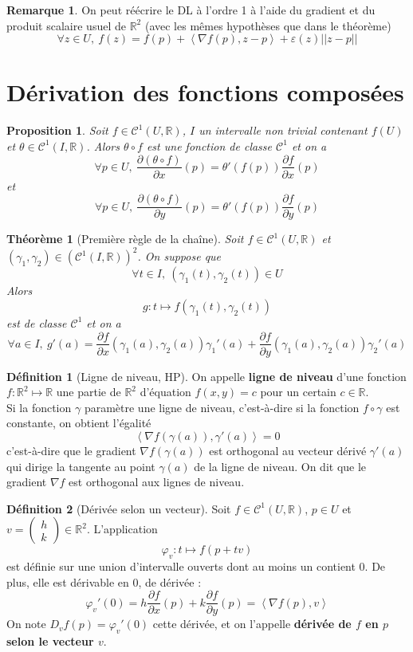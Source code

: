 \documentclass[french]{book}
\newcommand{\R}{\mathbb{R}}
\theoremstyle{plain}
\newtheorem{thm}{Théorème}[chapter]
\newtheorem{prop}{Proposition}[chapter]
\theoremstyle{definition}
\newtheorem{dfn}{Définition}[chapter]
\newtheorem{rmq}{Remarque}[chapter]
\theoremstyle{remark}
\begin{document}
\begin{rmq} On peut réécrire le DL à l'ordre 1 à l'aide du gradient et du produit scalaire usuel de $\R^2$ (avec les mêmes hypothèses que dans le théorème) $$\forall z \in U, \ f(z)=f(p)+\left\langle \nabla f(p),z-p\right\rangle + \varepsilon(z)||z-p||$$ \end{rmq}

\section{Dérivation des fonctions composées}
\begin{prop}
	Soit $f\in\mathcal{C}^1(U,\R)$, $I$ un intervalle non trivial contenant $f(U)$ et $\theta\in\mathcal{C}^1(I,\R)$. Alors $\theta\circ f$ est une fonction de classe $\mathcal{C}^1$ et on a $$\forall p \in U, \ \frac{\partial (\theta\circ f)}{\partial x}(p)=\theta'(f(p))\frac{\partial f}{\partial x}(p)$$ et$$\forall p \in U,\ \frac{\partial (\theta\circ f)}{\partial y}(p)=\theta'(f(p))\frac{\partial f}{\partial y}(p)$$ 
\end{prop}
\begin{thm}[Première règle de la chaîne]
	Soit $f\in\mathcal{C}^1(U,\R)$ et $(\gamma_1,\gamma_2)\in(\mathcal{C}^1(I,\R))^2$. On suppose que $$\forall t \in I, \ (\gamma_1(t),\gamma_2(t))\in U$$ Alors $$g:t\mapsto f(\gamma_1(t),\gamma_2(t))$$ est de classe $\mathcal{C}^1$ et on a $$\forall a \in I, \ g'(a)=\frac{\partial f}{\partial x}(\gamma_1(a),\gamma_2(a))\gamma_1'(a)+\frac{\partial f}{\partial y}(\gamma_1(a),\gamma_2(a))\gamma_2'(a)$$
\end{thm}
\begin{dfn}[Ligne de niveau, HP]
	On appelle \textbf{ligne de niveau} d'une fonction $f:\R^2\mapsto\R$ une partie de $\R^2$ d'équation $f(x,y)=c$ pour un certain $c\in\R$. \\ Si la fonction $\gamma$ paramètre une ligne de niveau, c'est-à-dire si la fonction $f\circ\gamma$ est constante, on obtient l'égalité $$\left\langle \nabla f(\gamma(a)),\gamma'(a)\right\rangle=0$$ c'est-à-dire que le gradient $\nabla f(\gamma(a))$ est orthogonal au vecteur dérivé $\gamma'(a)$ qui dirige la tangente au point $\gamma(a)$ de la ligne de niveau. On dit que le gradient $\nabla f$ est orthogonal aux lignes de niveau. 
\end{dfn}
\begin{dfn}[Dérivée selon un vecteur]
	Soit $f\in\mathcal{C}^1(U,\R)$, $p\in U$ et $v=\begin{pmatrix}
		h \\ k
	\end{pmatrix} \in \R^2$. L'application $$\varphi_v:t\mapsto f(p+tv)$$ est définie sur une union d'intervalle ouverts dont au moins un contient 0. De plus, elle est dérivable en $0$, de dérivée : $$\varphi_v'(0)=h\frac{\partial f}{\partial x}(p)+k\frac{\partial f}{\partial y}(p)=\left\langle \nabla f(p), v \right\rangle$$ On note $D_vf(p)=\varphi_v'(0)$ cette dérivée, et on l'appelle \textbf{dérivée de $f$ en $p$ selon le vecteur $v$}.
\end{dfn}
\end{document}
